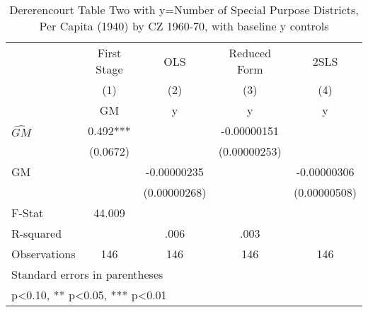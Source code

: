 \begin{table}[htbp]\centering
\def\sym#1{\ifmmode^{#1}\else\(^{#1}\)\fi}
\caption{Dererencourt Table Two with y=Number of Special Purpose Districts, Per Capita (1940) by CZ 1960-70, with baseline y controls}
\begin{tabular}{l*{4}{c}}
\toprule
                    & First Stage   &         OLS   &Reduced Form   &        2SLS   \\
                    &\multicolumn{1}{c}{(1)}&\multicolumn{1}{c}{(2)}&\multicolumn{1}{c}{(3)}&\multicolumn{1}{c}{(4)}\\
                    &\multicolumn{1}{c}{GM}&\multicolumn{1}{c}{y}&\multicolumn{1}{c}{y}&\multicolumn{1}{c}{y}\\
\midrule
$\hat{GM}$          &       0.492***&               & -0.00000151   &               \\
                    &    (0.0672)   &               &(0.00000253)   &               \\
\addlinespace
GM                  &               & -0.00000235   &               & -0.00000306   \\
                    &               &(0.00000268)   &               &(0.00000508)   \\
\midrule
F-Stat              &      44.009   &               &               &               \\
R-squared           &               &        .006   &        .003   &               \\
Observations        &         146   &         146   &         146   &         146   \\
\bottomrule
\multicolumn{5}{l}{\footnotesize Standard errors in parentheses}\\
\multicolumn{5}{l}{\footnotesize * p<0.10, ** p<0.05, *** p<0.01}\\
\end{tabular}
\end{table}
